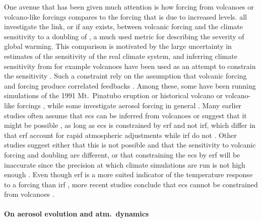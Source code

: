 \documentclass{ametsocV5}
\begin{document}
One avenue that has been given much attention is how forcing from volcanoes or
volcano-like forcings compares to the forcing that is due to increased  levels.
\citet{boer2007,marvel2016,merlis2014,ollila2016,richardson2019,salvi2022,wigley2005}
all investigate the link, or if any exists, between volcanic forcing and the climate
sensitivity to a doubling of , a much used metric for describing the severity of
global warming. This comparison is motivated by the large uncertainty in estimates of
the sensitivity of the real climate system, and inferring climate sensitivity from for
example volcanoes have been used as an attempt to constrain the sensitivity
\citep{boer2007}.
Such a constraint rely on the assumption that volcanic forcing and  forcing
produce correlated feedbacks \citep{pauling2023}. Among these, some have been running
simulations of the 1991 Mt.\ Pinatubo eruption \citep{merlis2014,ollila2016} or
historical volcano or volcano-like forcings \citep{boer2007,marvel2016,wigley2005},
while some investigate aerosol forcing in general \citep{richardson2019,salvi2022}. Many
earlier studies often assume that \ac{ecs} can be inferred from volcanoes
\citep{wigley2005} or suggest that it might be possible \citep{bender2010}, as long as
\ac{ecs} is constrained by \ac{erf} and not \ac{irf},
which differ in that \ac{erf} account for rapid atmospheric adjustments while \ac{irf}
do not \citep{richardson2019}. Other studies suggest either that this is not possible
and that the sensitivity to volcanic forcing and  doubling are different, or
that constraining the \ac{ecs} by \ac{erf} will be inaccurate since the precision at
which climate simulations are run is not high enough
\citep{douglass2006,boer2007,salvi2022}. Even though \ac{erf} is a more suited indicator
of the temperature response to a forcing than \ac{irf}
\citep{marvel2016,richardson2019}, more recent studies conclude that \ac{ecs} cannot be
constrained from volcanoes \citep{pauling2023}.

\paragraph*{On aerosol evolution and atm.\ dynamics}
\end{document}
